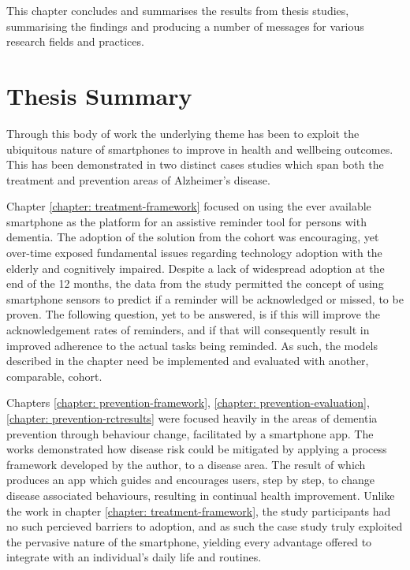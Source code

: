 \label{chapter: conclusion}

This chapter concludes and summarises the results from thesis studies, summarising the findings and producing a number of messages for various research fields and practices.

\section{Thesis Summary}
Through this body of work the underlying theme has been to exploit the ubiquitous nature of smartphones to improve in health and wellbeing outcomes. This has been demonstrated in two distinct cases studies which span both the treatment and prevention areas of Alzheimer's disease. 

Chapter \ref{chapter: treatment-framework} focused on using the ever available smartphone as the platform for an assistive reminder tool for persons with dementia. The adoption of the solution from the cohort was encouraging, yet over-time exposed fundamental issues regarding technology adoption with the elderly and cognitively impaired. Despite a lack of widespread adoption at the end of the 12 months, the data from the study permitted the concept of using smartphone sensors to predict if a reminder will be acknowledged or missed, to be proven. The following question, yet to be answered, is if this will improve the acknowledgement rates of reminders, and if that will consequently result in improved adherence to the actual tasks being reminded. As such, the models described in the chapter need be implemented and evaluated with another, comparable, cohort.

Chapters \ref{chapter: prevention-framework}, \ref{chapter: prevention-evaluation}, \ref{chapter: prevention-rctresults} were focused heavily in the areas of dementia prevention through behaviour change, facilitated by a smartphone app. The works demonstrated how disease risk could be mitigated by applying a process framework developed by the author, to a disease area. The result of which produces an app which guides and encourages users, step by step, to change disease associated behaviours, resulting in continual health improvement. Unlike the work in chapter \ref{chapter: treatment-framework}, the study participants had no such percieved barriers to adoption, and as such the case study truly exploited the pervasive nature of the smartphone, yielding every advantage offered to integrate with an individual’s daily life and routines. 
 
